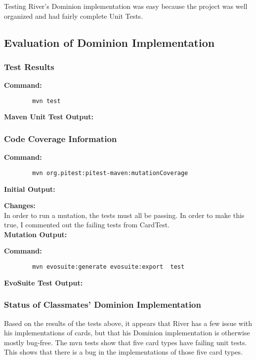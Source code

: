 \documentclass[letterpaper,10pt]{article}
\begin{document}
	Testing River's Dominion implementation was easy because the project was well organized 
	and had fairly complete Unit Tests.
	\subsection{Evaluation of Dominion Implementation}
		\subsubsection{Test Results}
		\textbf{Command:}
		\begin{lstlisting}
		mvn test
		\end{lstlisting}

		\textbf{Maven Unit Test Output:}
		

		\subsubsection{Code Coverage Information}
		\textbf{Command: }
		\begin{lstlisting}
		mvn org.pitest:pitest-maven:mutationCoverage
		\end{lstlisting}

		\textbf{Initial Output: }
		

		\textbf{Changes: }\\
		In order to run a mutation, the tests must all be passing. In order to make this true,
		 I commented out the failing tests from CardTest.\\

		\textbf{Mutation Output: }
		

		\textbf{Command:}
		\begin{lstlisting}
		mvn evosuite:generate evosuite:export  test 
		\end{lstlisting}

		\textbf{EvoSuite Test Output:}
		

		\subsubsection{Status of Classmates' Dominion Implementation}
		Based on the results of the tests above, it appears that River has a few issue 
		with his implementations of cards, but that his Dominion implementation is 
		otherwise mostly bug-free. The mvn tests show that five card types have failing 
		unit tests. This shows that there is a bug in the implementations of those five 
		card types. 
\end{document}
